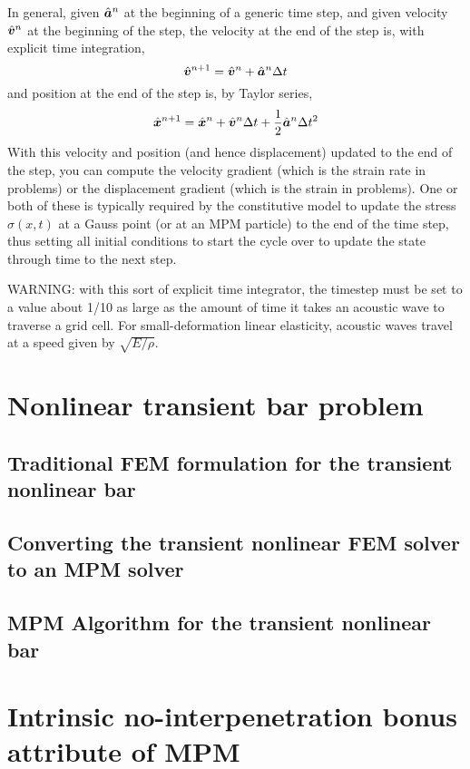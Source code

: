 In general, given $\hat{\bm{a}}^n$ at the beginning of a generic \nth time step, and given velocity $\hat{\bm{v}}^n$ at the beginning of the step, the velocity at the end of the step is, with explicit time integration,
\begin{equation}
  \hat{\bm{v}}^{n+1}=\hat{\bm{v}}^{n}+\hat{\bm{a}}^n \Delta {\ensuremath{t}}
\end{equation}
and position at the end of the step is, by Taylor series,
\begin{equation}
  \hat{\bm{x}}^{n+1}=\hat{\bm{x}}^{n}+\hat{\bm{v}}^n \Delta {\ensuremath{t}}+\frac{1}{2}\hat{\bm{a}}^n \Delta{\ensuremath{t}}^2
\end{equation}
With this velocity and position (and hence displacement) updated to the end of the step, you can compute the velocity gradient (which is the strain rate in \oneD problems) or the displacement gradient (which is the strain in \oneD problems). One or both of these is typically required by the constitutive model to update the stress $\sigma(x,t)$ at a Gauss point (or at an MPM particle) to the end of the time step, thus setting all initial conditions to start the cycle over to update the state through time to the next step. 

WARNING: with this sort of explicit time integrator, the timestep must be set to a value about 1/10 as large as the amount of time it takes an acoustic wave to traverse a grid cell. For small-deformation linear elasticity, acoustic waves travel at a speed given by $\sqrt{E/\rho}$.
\section{Nonlinear transient \twoD bar problem}
\subsection{Traditional FEM formulation for the transient nonlinear \twoD bar}
\subsection{Converting the \twoD transient nonlinear FEM solver to an MPM solver}
\subsection{MPM Algorithm for the \twoD transient nonlinear bar}

\section{Intrinsic no-interpenetration bonus attribute of MPM}






